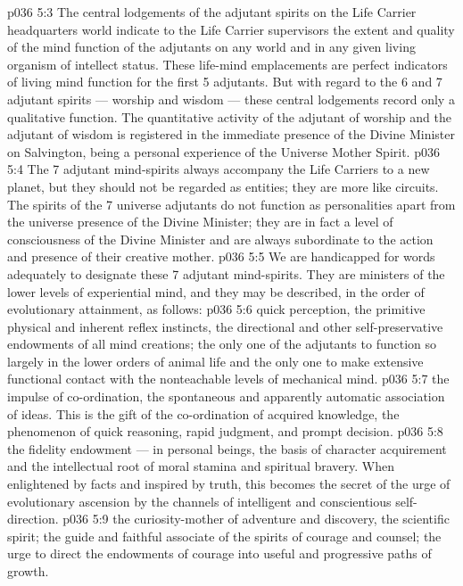 \vs p036 5:3 The central lodgements of the adjutant spirits on the Life Carrier headquarters world indicate to the Life Carrier supervisors the extent and quality of the mind function of the adjutants on any world and in any given living organism of intellect status. These life\hyp{}mind emplacements are perfect indicators of living mind function for the first 5 adjutants. But with regard to the 6 and 7 adjutant spirits --- worship and wisdom --- these central lodgements record only a qualitative function. The quantitative activity of the adjutant of worship and the adjutant of wisdom is registered in the immediate presence of the Divine Minister on Salvington, being a personal experience of the Universe Mother Spirit.
\vs p036 5:4 \pc The 7 adjutant mind\hyp{}spirits always accompany the Life Carriers to a new planet, but they should not be regarded as entities; they are more like circuits. The spirits of the 7 universe adjutants do not function as personalities apart from the universe presence of the Divine Minister; they are in fact a level of consciousness of the Divine Minister and are always subordinate to the action and presence of their creative mother.
\vs p036 5:5 We are handicapped for words adequately to designate these 7 adjutant mind\hyp{}spirits. They are ministers of the lower levels of experiential mind, and they may be described, in the order of evolutionary attainment, as follows:
\vs p036 5:6 \bibnobreakspace {} quick perception, the primitive physical and inherent reflex instincts, the directional and other self\hyp{}preservative endowments of all mind creations; the only one of the adjutants to function so largely in the lower orders of animal life and the only one to make extensive functional contact with the nonteachable levels of mechanical mind.
\vs p036 5:7 \bibnobreakspace {} the impulse of co\hyp{}ordination, the spontaneous and apparently automatic association of ideas. This is the gift of the co\hyp{}ordination of acquired knowledge, the phenomenon of quick reasoning, rapid judgment, and prompt decision.
\vs p036 5:8 \bibnobreakspace {} the fidelity endowment --- in personal beings, the basis of character acquirement and the intellectual root of moral stamina and spiritual bravery. When enlightened by facts and inspired by truth, this becomes the secret of the urge of evolutionary ascension by the channels of intelligent and conscientious self\hyp{}direction.
\vs p036 5:9 \bibnobreakspace {} the curiosity\hyp{}mother of adventure and discovery, the scientific spirit; the guide and faithful associate of the spirits of courage and counsel; the urge to direct the endowments of courage into useful and progressive paths of growth.
